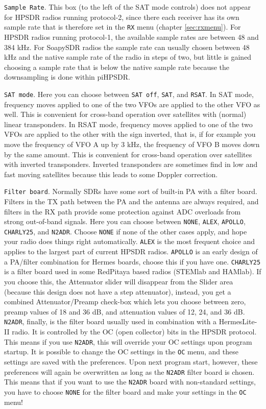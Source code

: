 \documentclass[12pt]{book}
\def\rett#1{\texttt{\color{red}#1}}
\def\bltt#1{\texttt{\color{blue}#1}}
\def\pH{pi\-HPSDR\xspace}
\begin{document}
\rett{Sample Rate}. This box (to the left of the SAT mode controls)
does not appear for HPSDR radios running protocol-2, since there each receiver
has its own sample rate that is therefore set in the \bltt{RX} menu (chapter \ref{sec:rxmenu}). For HPSDR
radios running protocol-1, the available sample rates are between 48 and 384 kHz. For SoapySDR radios the
sample rate can usually chosen between 48 kHz and the native sample rate of the radio in steps of two, but
little is gained choosing a sample rate that is below the native sample rate because the downsampling
is done within \pH.

\rett{SAT mode}. Here you can choose between \texttt{SAT off}, \texttt{SAT}, and \texttt{RSAT}. In SAT mode,
frequency moves applied to one of the two VFOs are applied to the other VFO as well. This is convenient
for cross-band operation over satellites with (normal) linear transponders. In RSAT mode, frequency
moves applied to one of the two VFOs are applied to the other with the sign inverted, that is, if
for example you move the frequency of VFO A up by 3 kHz, the frequency of VFO B moves down by the same
amount. This is convenient for cross-band operation over satellites with inverted transponders. Inverted
transponders are sometimes find in low and fast moving satellites because this leads to some Doppler
correction.

\rett{Filter board}. Normally SDRs have some sort of built-in PA with a filter board. Filters in the TX path
between the PA and the antenna are always required, and filters in the RX path provide some protection
against ADC overloads from strong out-of-band signals. Here you can choose between \texttt{NONE},
\texttt{ALEX},
\texttt{APOLLO}, \texttt{CHARLY25}, and \texttt{N2ADR}. Choose \texttt{NONE} if none of the other cases
apply, and hope your radio does things right automatically. \texttt{ALEX} is the most frequent choice
and applies to the largest part of current HPSDR radios. \texttt{APOLLO} is an early design of a
PA/filter combination for Hermes boards, choose this if you have one. \texttt{CHARLY25} is a filter board
used in some RedPitaya based radios (STEMlab and HAMlab). If you choose this, the Attenuator slider will
disappear from the Slider area (because this design does not have a step attenuator), instead, you get
a combined Attenuator/Preamp check-box which lets you choose between zero, preamp values of 18 and 36 dB,
and attenuation values of 12, 24, and 36 dB. \texttt{N2ADR}, finally, is the filter board usually used
in combination with a HermesLite-II radio. It is controlled by the OC (open collector) bits in the HPSDR
protocol. This means if you use \texttt{N2ADR}, this will override your OC settings upon program startup.
It is possible to change the OC settings in the \bltt{OC} menu, and these settings are saved with the
preferences. Upon next program start, however, these preferences will again be overwritten as long
as the \texttt{N2ADR} filter board is chosen. This means that if you want to use the \texttt{N2ADR}
board with non-standard settings, you have to choose \texttt{NONE} for the filter board and make
your settings in the \bltt{OC} menu!
\end{document}
